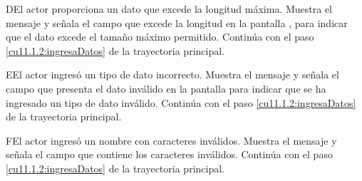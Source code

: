  \begin{UCtrayectoriaA}{D}{El actor proporciona un dato que excede la longitud máxima.}
    \UCpaso[\UCsist] Muestra el mensaje  y señala el campo que excede la 
    longitud en la pantalla , para indicar que el dato excede el tamaño máximo permitido.
    \UCpaso[] Continúa con el paso \ref{cu11.1.2:ingresaDatos} de la trayectoria principal.
 \end{UCtrayectoriaA}
 \begin{UCtrayectoriaA}{E}{El actor ingresó un tipo de dato incorrecto.}
    \UCpaso[\UCsist] Muestra el mensaje  y señala el campo que presenta el dato inválido en la 
    pantalla  para indicar que se ha ingresado un tipo de dato inválido.
    \UCpaso[] Continúa con el paso \ref{cu11.1.2:ingresaDatos} de la trayectoria principal.
 \end{UCtrayectoriaA}
 \begin{UCtrayectoriaA}{F}{El actor ingresó un nombre con caracteres inválidos.}
    \UCpaso[\UCsist] Muestra el mensaje  y señala el campo que contiene los caracteres inválidos.
    \UCpaso[] Continúa con el paso \ref{cu11.1.2:ingresaDatos} de la trayectoria principal.
 \end{UCtrayectoriaA}

